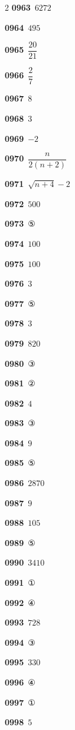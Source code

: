 \documentclass[10pt,a4paper]{article}
\begin{document}
\begin{multicols}{2}
\noindent\textbf{0963}\ $6272$\par
\noindent\textbf{0964}\ $495$\par
\noindent\textbf{0965}\ $\dfrac{20}{21}$\par
\noindent\textbf{0966}\ $\dfrac{2}{7}$\par
\noindent\textbf{0967}\ $8$\par
\noindent\textbf{0968}\ $3$\par
\noindent\textbf{0969}\ $-2$\par
\noindent\textbf{0970}\ $\dfrac{n}{2(n+2)}$\par
\noindent\textbf{0971}\ $\sqrt{n+4}-2$\par
\noindent\textbf{0972}\ $500$\par
\noindent\textbf{0973}\ ⑤\par
\noindent\textbf{0974}\ $100$\par
\noindent\textbf{0975}\ $100$\par
\noindent\textbf{0976}\ $3$\par
\noindent\textbf{0977}\ ⑤\par
\noindent\textbf{0978}\ $3$\par
\noindent\textbf{0979}\ $820$\par
\noindent\textbf{0980}\ ③\par
\noindent\textbf{0981}\ ②\par
\noindent\textbf{0982}\ $4$\par
\noindent\textbf{0983}\ ③\par
\noindent\textbf{0984}\ $9$\par
\noindent\textbf{0985}\ ⑤\par
\noindent\textbf{0986}\ $2870$\par
\noindent\textbf{0987}\ $9$\par
\noindent\textbf{0988}\ $105$\par
\noindent\textbf{0989}\ ⑤\par
\noindent\textbf{0990}\ $3410$\par
\noindent\textbf{0991}\ ①\par
\noindent\textbf{0992}\ ④\par
\noindent\textbf{0993}\ $728$\par
\noindent\textbf{0994}\ ③\par
\noindent\textbf{0995}\ $330$\par
\noindent\textbf{0996}\ ④\par
\noindent\textbf{0997}\ ①\par
\noindent\textbf{0998}\ $5$\par

\end{multicols}
\end{document}
